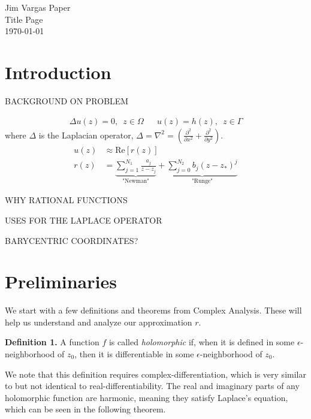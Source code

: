 \documentclass[12]{article}
\begin{document}
\begin{titlepage}
\begin{center}
\Huge
Jim Vargas Paper \\
Title Page \\
\today
\end{center}
\end{titlepage}

\tableofcontents 
\thispagestyle{empty}
\clearpage \setcounter{page}{1}


	\section{Introduction}
	
	BACKGROUND ON PROBLEM
	
	\begin{align*}
\Delta u(z) = 0,\enspace z\in \Omega &&
u(z)=h(z),\enspace z\in \Gamma
	\end{align*}
where $\Delta$ is the Laplacian operator, $\Delta = \nabla^2 = \left( \frac{\partial^2}{\partial x^2} + \frac{\partial^2}{\partial y^2}\right)$.
	\begin{align*}
u(z)&\approx \mathrm{Re}[r(z)] \\
r(z) &= \underbrace{\sum_{j=1}^{N_1} \frac{a_j}{z-z_j}}_\text{"Newman"} + \underbrace{\sum_{j=0}^{N_2} b_j (z-z_*)^j}_\text{"Runge"} 
	\end{align*}
	
	WHY RATIONAL FUNCTIONS
	
	USES FOR THE LAPLACE OPERATOR
	
	BARYCENTRIC COORDINATES?
	
	
	\section{Preliminaries}
	We start with a few definitions and theorems from Complex Analysis. These will help us understand and analyze our approximation $r$. 
	
	\textbf{Definition 1.} A function $f$ is called \textit{holomorphic} if, when it is defined in some $\epsilon$-neighborhood of $z_0$, then it is differentiable in some $\epsilon$-neighborhood of $z_0$. 
	
	We note that this definition requires complex-differentiation, which is very similar to but not identical to real-differentiability. The real and imaginary parts of any holomorphic function are harmonic, meaning they satisfy Laplace's equation, which can be seen in the following theorem. 
	
\end{document}
